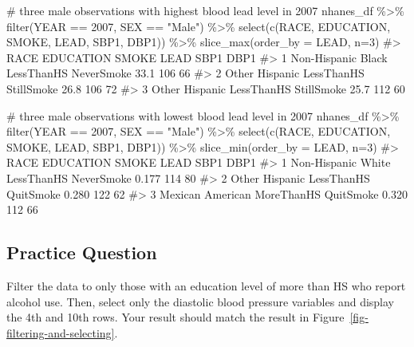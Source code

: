\documentclass[
  letterpaper,
]{krantz}
\makeatletter
\newenvironment{Shaded}{\begin{snugshade}}{\end{snugshade}}
\newcommand{\AttributeTok}[1]{\textcolor[rgb]{0.40,0.45,0.13}{#1}}
\newcommand{\CommentTok}[1]{\textcolor[rgb]{0.37,0.37,0.37}{#1}}
\newcommand{\DecValTok}[1]{\textcolor[rgb]{0.68,0.00,0.00}{#1}}
\newcommand{\FunctionTok}[1]{\textcolor[rgb]{0.28,0.35,0.67}{#1}}
\newcommand{\NormalTok}[1]{\textcolor[rgb]{0.00,0.23,0.31}{#1}}
\newcommand{\SpecialCharTok}[1]{\textcolor[rgb]{0.37,0.37,0.37}{#1}}
\newcommand{\StringTok}[1]{\textcolor[rgb]{0.13,0.47,0.30}{#1}}
\newenvironment{kframe}{%
\medskip{}
\setlength{\fboxsep}{.8em}
 \def\at@end@of@kframe{}%
 \ifinner\ifhmode%
  \def\at@end@of@kframe{\end{minipage}}%
  \begin{minipage}{\columnwidth}%
 \fi\fi%
 \def\FrameCommand##1{\hskip\@totalleftmargin \hskip-\fboxsep
 \colorbox{shadecolor}{##1}\hskip-\fboxsep
     \hskip-\linewidth \hskip-\@totalleftmargin \hskip\columnwidth}%
 \MakeFramed {\advance\hsize-\width
   \@totalleftmargin\z@ \linewidth\hsize
   \@setminipage}}%
 {\par\unskip\endMakeFramed%
 \at@end@of@kframe}
\renewenvironment{Shaded}{\begin{kframe}}{\end{kframe}}
\makeatother
\begin{document}
\begin{Shaded}
\begin{Highlighting}[]
\CommentTok{\# three male observations with highest blood lead level in 2007}
\NormalTok{nhanes\_df }\SpecialCharTok{\%\textgreater{}\%}
  \FunctionTok{filter}\NormalTok{(YEAR }\SpecialCharTok{==} \DecValTok{2007}\NormalTok{, SEX }\SpecialCharTok{==} \StringTok{"Male"}\NormalTok{) }\SpecialCharTok{\%\textgreater{}\%}
  \FunctionTok{select}\NormalTok{(}\FunctionTok{c}\NormalTok{(RACE, EDUCATION, SMOKE, LEAD, SBP1, DBP1)) }\SpecialCharTok{\%\textgreater{}\%}
  \FunctionTok{slice\_max}\NormalTok{(}\AttributeTok{order\_by =}\NormalTok{ LEAD, }\AttributeTok{n=}\DecValTok{3}\NormalTok{)}
\CommentTok{\#\textgreater{}                 RACE  EDUCATION      SMOKE LEAD SBP1 DBP1}
\CommentTok{\#\textgreater{} 1 Non{-}Hispanic Black LessThanHS NeverSmoke 33.1  106   66}
\CommentTok{\#\textgreater{} 2     Other Hispanic LessThanHS StillSmoke 26.8  106   72}
\CommentTok{\#\textgreater{} 3     Other Hispanic LessThanHS StillSmoke 25.7  112   60}

\CommentTok{\# three male observations with lowest blood lead level in 2007}
\NormalTok{nhanes\_df }\SpecialCharTok{\%\textgreater{}\%}
  \FunctionTok{filter}\NormalTok{(YEAR }\SpecialCharTok{==} \DecValTok{2007}\NormalTok{, SEX }\SpecialCharTok{==} \StringTok{"Male"}\NormalTok{) }\SpecialCharTok{\%\textgreater{}\%}
  \FunctionTok{select}\NormalTok{(}\FunctionTok{c}\NormalTok{(RACE, EDUCATION, SMOKE, LEAD, SBP1, DBP1)) }\SpecialCharTok{\%\textgreater{}\%}
  \FunctionTok{slice\_min}\NormalTok{(}\AttributeTok{order\_by =}\NormalTok{ LEAD, }\AttributeTok{n=}\DecValTok{3}\NormalTok{)}
\CommentTok{\#\textgreater{}                 RACE  EDUCATION      SMOKE  LEAD SBP1 DBP1}
\CommentTok{\#\textgreater{} 1 Non{-}Hispanic White LessThanHS NeverSmoke 0.177  114   80}
\CommentTok{\#\textgreater{} 2     Other Hispanic LessThanHS  QuitSmoke 0.280  122   62}
\CommentTok{\#\textgreater{} 3   Mexican American MoreThanHS  QuitSmoke 0.320  112   66}
\end{Highlighting}
\end{Shaded}

\subsection{Practice Question}\label{practice-question-8}

Filter the data to only those with an education level of more than HS
who report alcohol use. Then, select only the diastolic blood pressure
variables and display the 4th and 10th rows. Your result should match
the result in Figure~\ref{fig-filtering-and-selecting}.
\end{document}
